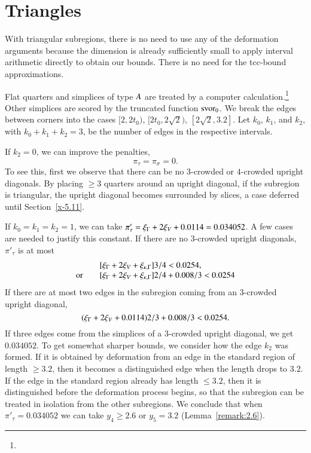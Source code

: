 \section{Triangles} %

With triangular subregions, there is no need to use any of the
deformation arguments because the dimension is already sufficiently
small to apply interval arithmetic directly to obtain our bounds.
There is no need for the tcc-bound approximations.

Flat quarters and simplices of type $A$ are treated by a computer
calculation.\footnote{} %
Other simplices are scored by the truncated function
$\operatorname{svor}_0$. We break the edges between corners into the cases
    $[2,2t_0)$, $[2t_0,2\sqrt{2})$, $[2\sqrt{2},3.2]$.
Let $k_0$, $k_1$, and $k_2$, with $k_0+k_1+k_2=3$, be the number
of edges  in the respective intervals.

If $k_2=0$, we can improve the penalties,
    $$\pi_\tau = \pi_\sigma=0.$$
To see this, first we observe that there can be no $3$-crowded or
$4$-crowded upright diagonals. By placing $\ge3$ quarters around
an upright diagonal, if the subregion is triangular, the upright
diagonal becomes surrounded by slices, a case deferred
until Section~\ref{x-5.11}.

If $k_0=k_1=k_2=1$, we can take $\pi'_\tau=
\xi_\Gamma+2\xi_V+0.0114=0.034052$. A few cases are needed to justify
this constant. If there are no $3$-crowded upright diagonals,
$\pi'_\tau$ is at most
    $$
    \begin{array}{lll}
    &[\xi_\Gamma + 2 \xi_V +\xi_{\kappa,\Gamma} ]3/4 < 0.0254,\\
    \hbox{or\quad }&[\xi_\Gamma+2\xi_V+\xi_{\kappa,\Gamma}]2/4 + 0.008/3 < 0.0254
    \end{array}
    $$
If there are at most two edges in the subregion coming from an
$3$-crowded upright diagonal,
    $$(\xi_\Gamma+2\xi_V+0.0114)2/3 + 0.008/3 < 0.0254.$$
If three edges come from the simplices of a $3$-crowded upright
diagonal, we get $0.034052$. To get somewhat sharper bounds, we
consider how the edge $k_2$ was formed.  If it is obtained by
deformation from an edge in the standard region of length
$\ge3.2$, then it becomes a distinguished edge when the length
drops to $3.2$.  If the edge in the standard region already has
length $\le3.2$, then it is distinguished before the deformation
process begins, so that the subregion can be treated in isolation
from the other subregions. We conclude that when
$\pi'_\tau=0.034052$ we can take $y_4\ge2.6$ or $y_5=3.2$
(Lemma~\ref{remark:2.6}).

